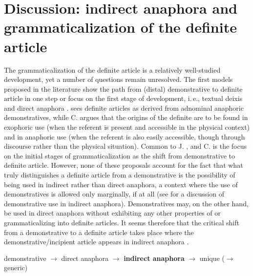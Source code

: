 \documentclass[output=paper]{langsci/langscibook}
\begin{document}
\section{Discussion: indirect anaphora and grammaticalization of the definite article}\label{6sec:5}

The grammaticalization of the definite article is a relatively well-studied development, yet a number of questions remain unresolved. The first models proposed in the literature show the path from (distal) demonstrative to definite article in one step \citep{greenberg:78} or focus on the first stage of development, i.\,e., textual deixis and direct anaphora \citep[J.][]{lyons:75}. \cite{diessel:99} sees definite articles as derived from adnominal anaphoric demonstratives, while C. \cite{lyons:99} argues that the origins of the definite are to be found in exophoric use (when the referent is present and accessible in the physical context) and in anaphoric use (when the referent is also easily accessible, though through discourse rather than the physical situation). Common to J. \cite{lyons:75}, \cite{diessel:99} and C. \cite{lyons:99} is the focus on the initial stages of grammaticalization as the shift from demonstrative to definite article. However, none of these proposals account for the fact that what truly distinguishes a definite article from a demonstrative is the possibility of being used in indirect rather than direct anaphora, a context where the use of demonstratives is allowed only marginally, if at all (see \citealt{charolles:99} for a discussion of demonstrative use in indirect anaphora). Demonstratives may, on the other hand, be used in direct anaphora without exhibiting any other properties of or grammaticalizing into definite articles. It seems therefore that the critical shift from a demonstrative to a definite article takes place where the demonstrative/incipient article appears in indirect anaphora \citep[see also][]{mulder:carlier:11,skrzypek:12}. 

\begin{exe}
\ex
{demonstrative $\rightarrow$ direct anaphora $\rightarrow$ {\bf{indirect anaphora}} $\rightarrow$ unique  ($\rightarrow$ generic)}
\end{exe}
\end{document}

